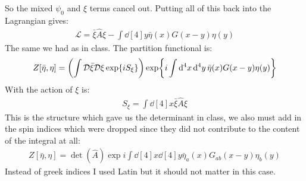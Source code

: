 \documentclass[12pt]{article}
\renewcommand{\L}{\mathcal{L}}
\newcommand{\cD}{\mathcal{D}}
\newcommand{\etab}{\bar{\eta}}
\newcommand{\xib}{\bar{\xi}}
\newcommand{\A}{\hat{A}}
\begin{document}
So the mixed $\psi_0$ and $\xi$ terms cancel out. Putting all of this back into the Lagrangian gives:
\begin{align*}
  \L=\xib\A\xi-\int\dd[4]{y}\etab(x)G(x-y)\eta(y)
\end{align*}
The same we had as in class. The partition functional is:
\begin{align*}
  Z[\etab,\eta]=\qty(\int\cD\xib\cD\xi\exp{iS_\xi})
  \exp{i\int\dd[4]{x}\dd[4]{y}\etab(x)G(x-y)\eta(y)}
\end{align*}
With the action of $\xi$ is:
\begin{align*}
  S_\xi=\int\dd[4]{x}\xib\A\xi
\end{align*}
This is the structure which gave us the determinant in class, we also must add in the spin indices which were dropped since they did not contribute to the content of the integral at all:
\begin{align*}
  \boxed{Z[\etab,\eta]=\det(\A)
  \exp{i\int\dd[4]{x}\dd[4]{y}\etab_a(x)G_{ab}(x-y)\eta_b(y)}}
\end{align*}
Instead of greek indices I used Latin but it should not matter in this case. 
\end{document}

